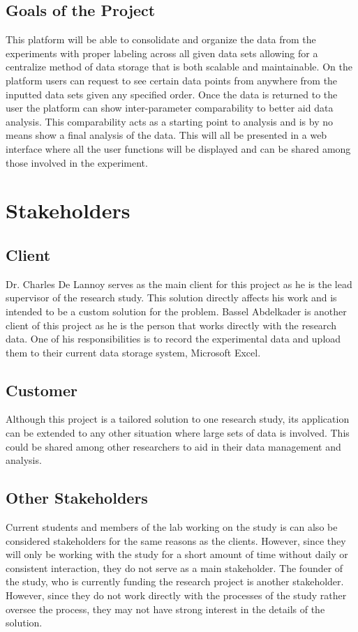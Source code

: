 \documentclass[12pt]{article}
\begin{document}
\subsection{Goals of the Project}
This platform will be able to consolidate and organize the data from the
experiments with proper labeling across all given data sets allowing for a
centralize method of data storage that is both scalable and maintainable. On the
platform users can request to see certain data points from anywhere from the
inputted data sets given any specified order. Once the data is returned to the
user the platform can show inter-parameter comparability to better aid data
analysis. This comparability acts as a starting point to analysis and is by no
means show a final analysis of the data. This will all be presented in a web
interface where all the user functions will be displayed and can be shared among
those involved in the experiment.   
\section{Stakeholders}

\subsection{Client}
Dr. Charles De Lannoy serves as the main client for this project as he is the
lead supervisor of the research study. This solution directly affects his work
and is intended to be a custom solution for the problem. Bassel Abdelkader is
another client of this project as he is the person that works directly with the
research data. One of his responsibilities is to record the experimental data
and upload them to their current data storage system, Microsoft Excel. 
\subsection{Customer}
Although this project is a tailored solution to one research study, its
application can be extended to any other situation where large sets of data is
involved. This could be shared among other researchers to aid in their data
management and analysis. 
\subsection{Other Stakeholders}
Current students and members of the lab working on the study is can also be
considered stakeholders for the same reasons as the clients. However, since they
will only be working with the study for a short amount of time without daily or
consistent interaction, they do not serve as a main stakeholder. The founder of
the study, who is currently funding the research project is another stakeholder.
However, since they do not work directly with the processes of the study rather
oversee the process, they may not have strong interest in the details of the
solution. 
\end{document}
